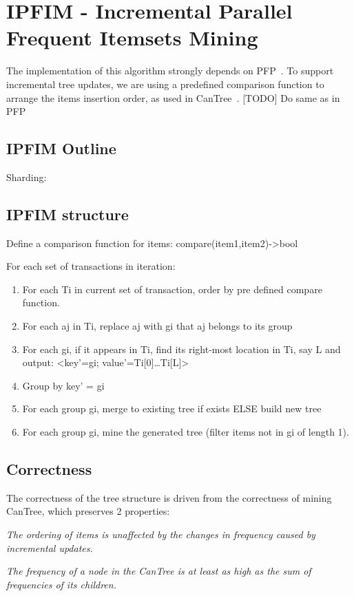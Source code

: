 \section{IPFIM - Incremental Parallel Frequent Itemsets Mining}
The implementation of this algorithm strongly depends on PFP~\cite{li2008pfp}. To support incremental tree updates, we are using a predefined comparison function to arrange the items insertion order, as used in CanTree~\cite{leung2005cantree}.
[TODO]
Do same as in PFP
\subsection{IPFIM Outline}
\begin{steps}
	\item Sharding:
	\end{steps}
\subsection{IPFIM structure}
\begin{steps}
	\item Define a comparison function for items: compare(item1,item2)->bool
	\item For each set of transactions in iteration:
		\begin{enumerate}
			\item For each Ti in current set of transaction, order by pre defined compare function.
			\item For each aj in Ti, replace aj with gi that aj belongs to its group
			\item For each gi, if it appears in Ti, find its right-most location in Ti, say L and output:
 <key'=gi; value'={Ti[0]…Ti[L]}>
 			\item Group by key' = gi
 			\item For each group gi, merge to existing tree if exists ELSE build new tree
 			\item For each group gi, mine the generated tree (filter items not in gi of length 1).
		\end{enumerate}
\end{steps}

\subsection{Correctness}
The correctness of the tree structure is driven from the correctness of mining CanTree, which preserves 2 properties:
\begin{properties}
\item \textit{The ordering of items is unaffected by the
changes in frequency caused by incremental updates.}
\item \textit{The frequency of a node in the CanTree is at
least as high as the sum of frequencies of its children.}
\end{properties}


